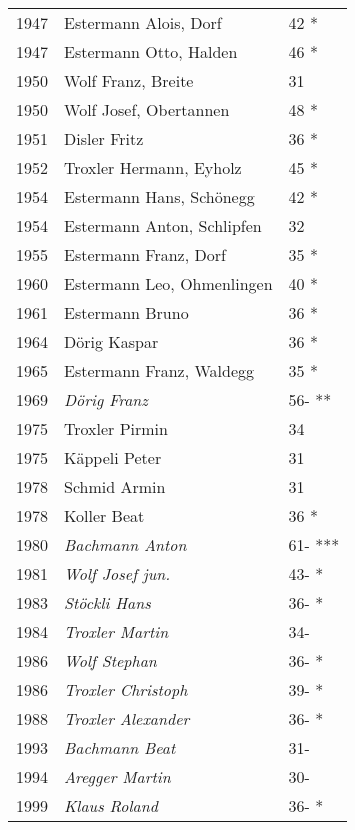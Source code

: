 {\begin{longtable}{ l l l }
        1947          & Estermann Alois, Dorf         & 42 *        \\
        1947          & Estermann Otto,  Halden       & 46 *        \\
        1950          & Wolf Franz, Breite            & 31          \\
        1950          & Wolf Josef, Obertannen        & 48 *        \\
        1951          & Disler Fritz                  & 36 *        \\
        1952          & Troxler Hermann, Eyholz       & 45 *        \\
        1954          & Estermann Hans, Schönegg      & 42 *        \\
        1954          & Estermann Anton, Schlipfen    & 32          \\
        1955          & Estermann Franz, Dorf         & 35 *        \\
        1960          & Estermann Leo, Ohmenlingen    & 40 *        \\
        1961          & Estermann Bruno               & 36 *        \\
        1964          & Dörig Kaspar                  & 36 *        \\
        1965          & Estermann Franz, Waldegg      & 35 *        \\
        1969          & \emph{Dörig Franz}            & 56- **      \\
        1975          & Troxler Pirmin                & 34          \\
        1975          & Käppeli Peter                 & 31          \\
        1978          & Schmid Armin                  & 31          \\
        1978          & Koller Beat                   & 36 *        \\
        1980          & \emph{Bachmann Anton}         & 61- ***     \\
        1981          & \emph{Wolf Josef jun.}        & 43- *       \\
        1983          & \emph{Stöckli Hans}           & 36- *       \\
        1984          & \emph{Troxler Martin}         & 34-         \\
        1986          & \emph{Wolf Stephan}           & 36- *       \\
        1986          & \emph{Troxler Christoph}      & 39- *       \\
        1988          & \emph{Troxler Alexander}      & 36- *       \\
        1993          & \emph{Bachmann Beat}          & 31-         \\
        1994          & \emph{Aregger Martin}         & 30-         \\
        1999          & \emph{Klaus Roland}           & 36- *       \\
    \end{longtable}
    \unskip
    \unpenalty
    \unpenalty}

